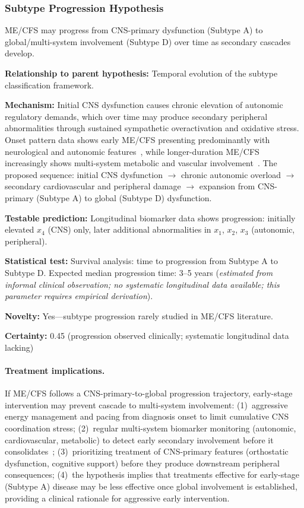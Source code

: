 \subsubsection{Subtype Progression Hypothesis}

\begin{hypothesis}
\label{hyp:subtype-progression}
ME/CFS may progress from CNS-primary dysfunction (Subtype A) to global/multi-system involvement (Subtype D) over time as secondary cascades develop.

\textbf{Relationship to parent hypothesis:} Temporal evolution of the subtype classification framework.

\textbf{Mechanism:} Initial CNS dysfunction causes chronic elevation of autonomic regulatory demands, which over time may produce secondary peripheral abnormalities through sustained sympathetic overactivation and oxidative stress. Onset pattern data shows early ME/CFS presenting predominantly with neurological and autonomic features~\cite{Jason2019onset}, while longer-duration ME/CFS increasingly shows multi-system metabolic and vascular involvement~\cite{heng2025mecfs}. The proposed sequence: initial CNS dysfunction $\to$ chronic autonomic overload $\to$ secondary cardiovascular and peripheral damage $\to$ expansion from CNS-primary (Subtype A) to global (Subtype D) dysfunction.

\textbf{Testable prediction:} Longitudinal biomarker data shows progression: initially elevated $x_4$ (CNS) only, later additional abnormalities in $x_1$, $x_2$, $x_3$ (autonomic, peripheral).

\textbf{Statistical test:} Survival analysis: time to progression from Subtype A to Subtype D. Expected median progression time: 3--5 years (\emph{estimated from informal clinical observation; no systematic longitudinal data available; this parameter requires empirical derivation}).

\textbf{Novelty:} Yes---subtype progression rarely studied in ME/CFS literature.

\textbf{Certainty:} 0.45 (progression observed clinically; systematic longitudinal data lacking)

\paragraph{Treatment implications.}
If ME/CFS follows a CNS-primary-to-global progression trajectory, early-stage intervention may prevent cascade to multi-system involvement: (1)~aggressive energy management and pacing from diagnosis onset to limit cumulative CNS coordination stress; (2)~regular multi-system biomarker monitoring (autonomic, cardiovascular, metabolic) to detect early secondary involvement before it consolidates~\cite{heng2025mecfs}; (3)~prioritizing treatment of CNS-primary features (orthostatic dysfunction, cognitive support) before they produce downstream peripheral consequences; (4)~the hypothesis implies that treatments effective for early-stage (Subtype A) disease may be less effective once global involvement is established, providing a clinical rationale for aggressive early intervention.


\end{hypothesis}
